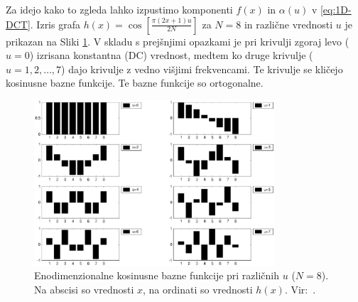 \documentclass[a4paper,12pt,openright]{book}
\begin{document}
Za idejo kako to zgleda lahko izpustimo komponenti $f(x)$ in $\alpha(u)$ v \eqref{eq:1D-DCT}. Izris grafa  $ h(x) = \cos[\frac{\pi(2x+1)u}{2N}]$ za $N=8$ in različne vrednosti $u$ je prikazan na Sliki \ref{1D_bazne_funkcije}. V skladu s prejšnjimi opazkami je pri krivulji zgoraj levo ($u=0$) izrisana konstantna (DC) vrednost, medtem ko druge krivulje ($u=1,2,\ldots,7$) dajo krivulje z vedno višjimi frekvencami. Te krivulje se kličejo kosinusne bazne funkcije. Te bazne funkcije so ortogonalne. 
\begin{figure}[ht] %
\begin{center}
\includegraphics[width=0.8\textwidth]{slike/bazne_funkcije_1D.pdf}
\end{center}
\caption{Enodimenzionalne kosinusne bazne funkcije pri različnih $u$ ($N=8$). Na abscisi so vrednosti $x$, na ordinati so vrednosti $h(x)$. Vir:~\cite{DCT_article}.}
\label{1D_bazne_funkcije}
\end{figure}
\end{document}
